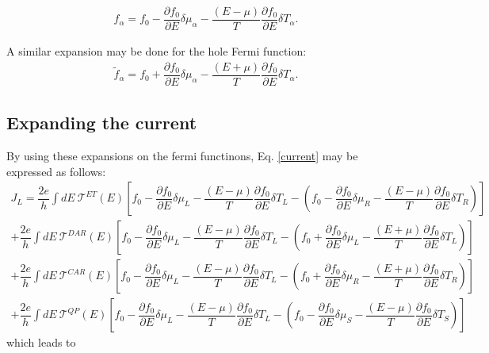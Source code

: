 \begin{align*}
f_{\alpha}=f_{0}-\dfrac{\partial f_{0}}{\partial E}\delta\mu_{\alpha}
-
\dfrac{(E-\mu)}{T}\dfrac{\partial f_{0}}{\partial E}\delta T_{\alpha}.
\end{align*}

A similar expansion may be done for the hole Fermi function:
\begin{align*}
\tilde{f}_{\alpha}=f_{0}+\dfrac{\partial f_{0}}{\partial E}\delta\mu_{\alpha}
-
\dfrac{(E+\mu)}{T}\dfrac{\partial f_{0}}{\partial E}\delta T_{\alpha}.
\end{align*}

\subsection{Expanding the current}
By using these expansions on the fermi functinons, Eq. \eqref{current} may be expressed as follows:
\begin{multline}\label{current2}
J_{L}
=
\dfrac{2e}{h}\int dE~\mathcal{T}^{ET}(E)
\left[
f_{0}-\dfrac{\partial f_{0}}{\partial E}\delta\mu_{L}
-
\dfrac{(E-\mu)}{T}\dfrac{\partial f_{0}}{\partial E}\delta T_{L}
-\left(f_{0}-\dfrac{\partial f_{0}}{\partial E}\delta\mu_{R}
-
\dfrac{(E-\mu)}{T}\dfrac{\partial f_{0}}{\partial E}\delta T_{R}\right)
\right]
\\+
\dfrac{2e}{h}\int dE~\mathcal{T}^{DAR}(E)
\left[
f_{0}-\dfrac{\partial f_{0}}{\partial E}\delta\mu_{L}
-
\dfrac{(E-\mu)}{T}\dfrac{\partial f_{0}}{\partial E}\delta T_{L}
-\left(f_{0}+\dfrac{\partial f_{0}}{\partial E}\delta\mu_{L}
-
\dfrac{(E+\mu)}{T}\dfrac{\partial f_{0}}{\partial E}\delta T_{L}\right)
\right]
\\+
\dfrac{2e}{h}\int dE~\mathcal{T}^{CAR}(E)\left[
f_{0}-\dfrac{\partial f_{0}}{\partial E}\delta\mu_{L}
-
\dfrac{(E-\mu)}{T}\dfrac{\partial f_{0}}{\partial E}\delta T_{L}
-\left(f_{0}+\dfrac{\partial f_{0}}{\partial E}\delta\mu_{R}
-
\dfrac{(E+\mu)}{T}\dfrac{\partial f_{0}}{\partial E}\delta T_{R}\right)
\right]
\\+
\dfrac{2e}{h}\int dE~\mathcal{T}^{QP}(E)\left[
f_{0}-\dfrac{\partial f_{0}}{\partial E}\delta\mu_{L}
-
\dfrac{(E-\mu)}{T}\dfrac{\partial f_{0}}{\partial E}\delta T_{L}
-\left(f_{0}-\dfrac{\partial f_{0}}{\partial E}\delta\mu_{S}
-
\dfrac{(E-\mu)}{T}\dfrac{\partial f_{0}}{\partial E}\delta T_{S}\right)
\right]
\end{multline}
which leads to
